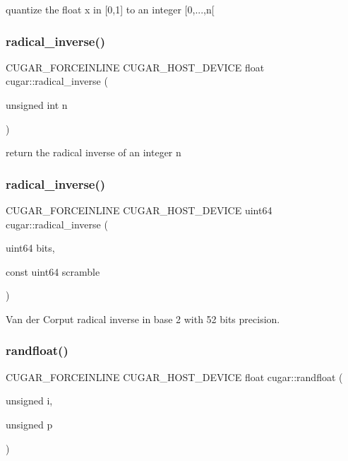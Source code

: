 quantize the float x in \mbox{[}0,1\mbox{]} to an integer \mbox{[}0,...,n\mbox{[} \mbox{\label{group___basic_gae90dc4da8454b145d3307d6dadbc3c37}} 
\subsubsection{\texorpdfstring{radical\+\_\+inverse()}{radical\_inverse()}\hspace{0.1cm}{\footnotesize\ttfamily [1/2]}}
{\footnotesize\ttfamily C\+U\+G\+A\+R\+\_\+\+F\+O\+R\+C\+E\+I\+N\+L\+I\+NE C\+U\+G\+A\+R\+\_\+\+H\+O\+S\+T\+\_\+\+D\+E\+V\+I\+CE float cugar\+::radical\+\_\+inverse (\begin{DoxyParamCaption}\item[{unsigned int}]{n }\end{DoxyParamCaption})}

return the radical inverse of an integer n \mbox{\label{group___basic_ga1a2fbc282e52dbc566f9cc0515caf6de}} 
\subsubsection{\texorpdfstring{radical\+\_\+inverse()}{radical\_inverse()}\hspace{0.1cm}{\footnotesize\ttfamily [2/2]}}
{\footnotesize\ttfamily C\+U\+G\+A\+R\+\_\+\+F\+O\+R\+C\+E\+I\+N\+L\+I\+NE C\+U\+G\+A\+R\+\_\+\+H\+O\+S\+T\+\_\+\+D\+E\+V\+I\+CE uint64 cugar\+::radical\+\_\+inverse (\begin{DoxyParamCaption}\item[{uint64}]{bits,  }\item[{const uint64}]{scramble }\end{DoxyParamCaption})}

Van der Corput radical inverse in base 2 with 52 bits precision. \mbox{\label{group___basic_ga215e28e8a87955931f3cdb9b9797ff68}} 
\subsubsection{\texorpdfstring{randfloat()}{randfloat()}}
{\footnotesize\ttfamily C\+U\+G\+A\+R\+\_\+\+F\+O\+R\+C\+E\+I\+N\+L\+I\+NE C\+U\+G\+A\+R\+\_\+\+H\+O\+S\+T\+\_\+\+D\+E\+V\+I\+CE float cugar\+::randfloat (\begin{DoxyParamCaption}\item[{unsigned}]{i,  }\item[{unsigned}]{p }\end{DoxyParamCaption})}

